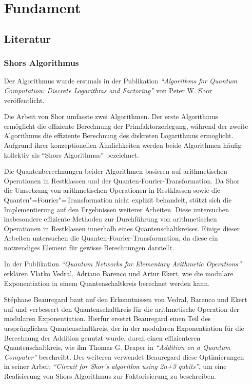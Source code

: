 \section{Fundament}
\subsection{Literatur} 
\subsubsection*{Shors Algorithmus}
Der Algorithmus wurde erstmals in der Publikation \textit{"`Algorithms for Quantum Computation: Discrete Logarithms and Factoring"'} von Peter W. Shor veröffentlicht.

Die Arbeit von Shor umfasste zwei Algorithmen.
Der erste Algorithmus ermöglicht die effiziente Berechnung der Primfaktorzerlegung, 
während der zweite Algorithmus die effiziente Berechnung des diskreten Logarithmus ermöglicht.
Aufgrund ihrer konzeptionellen Ähnlichkeiten werden beide Algorithmen häufig kollektiv als "`Shors Algorithmus"' bezeichnet.

Die Quantenberechnungen beider Algorithmen basieren auf arithmetischen Operationen in Restklassen und der Quanten-Fourier-Transformation.
Da Shor die Umsetzung von arithmetischen Operationen in Restklassen sowie die Quanten"=Fourier"=Transformation nicht explizit behandelt,
stützt sich die Implementierung auf den Ergebnissen weiterer Arbeiten. 
Diese untersuchen insbesondere effiziente Methoden zur Durchführung von arithmetischen Operationen in Restklassen innerhalb eines Quantenschaltkreises.
Einige dieser Arbeiten untersuchen die Quanten-Fourier-Transformation, 
da diese ein notwendiges Element für gewisse Berechnungen darstellt.

In der Publikation \textit{"`Quantum Networks for Elementary Arithmetic Operations"'} erklären Vlatko Vedral,  Adriano Barenco und Artur Ekert,
wie die modulare Exponentiation in einem Quantenschaltkreis berechnet werden kann. 

St\'{e}phane Beauregard baut auf den Erkenntnissen von Vedral, Barenco und Ekert auf und
verbessert den Quantenschaltkreis für die arithmetische Operation der modularen Exponentiation.
Hierfür ersetzt Beauregard einen Teil des ursprünglichen Quantenschaltkreis,
der in der modularen Exponentiation für die Berechnung der Addition genutzt wurde, 
durch einen effizienteren Quantenschaltkreis,
wie ihn Thomas G. Draper in \textit{"`Addition on a Quantum Computer"'} beschreibt.
Des weiteren verwendet Beauregard diese Optimierungen in seiner Arbeit \textit{"`Circuit for Shor’s algorithm using 2n+3 qubits"'},
um eine Realisierung von Shors Algorithmus zur Faktorisierung zu beschreiben.

